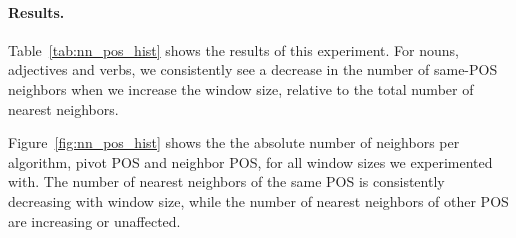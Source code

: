 \documentclass[11pt,a4paper]{article}
\begin{document}
    \paragraph{Results.}
    
    Table~\ref{tab:nn_pos_hist} shows the results of this experiment.
    For nouns, adjectives and verbs, we consistently see a decrease in
    the  number of same-POS neighbors when we increase the window size,
    relative to the total number of nearest
    neighbors.
    
    
    Figure~\ref{fig:nn_pos_hist} shows the the absolute number of neighbors per algorithm,
    pivot POS and neighbor POS, for all window sizes we experimented with.
    The number of nearest neighbors of the same POS is consistently decreasing with window size,
    while the number of nearest neighbors of other POS are increasing or unaffected.
    
\end{document}
